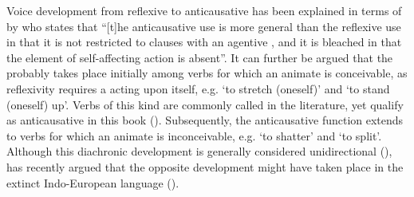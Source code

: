 \newpage

Voice development from reflexive to anticausative has been explained in terms of  by \cite[45]{haspelmath:1990} who states that “[t]he anti\-cau\-sa\-tive use is more general than the reflexive use in that it is not restricted to clauses with an agentive , and it is bleached in that the element of self-affecting action is absent”. It can further be argued that the  probably takes place initially among verbs for which an animate  is conceivable, as reflexivity requires a  acting upon itself, e.g. ‘to stretch (oneself)’ and ‘to stand (oneself) up’. Verbs of this kind are commonly called  in the literature, yet qualify as anticausative in this book (). Subsequently, the anticausative function extends to verbs for which an animate  is inconceivable, e.g. ‘to shatter’ and ‘to split’. Although this diachronic development is generally considered unidirectional (), \cite{inglese:2020} has recently argued that the opposite development might have taken place in the extinct Indo-European language  ().

